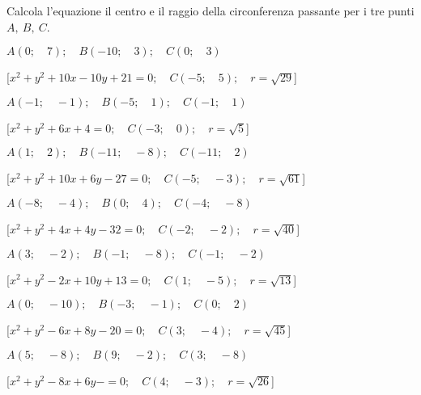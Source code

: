 \begin{esercizio}\label{ese:}
 Calcola l'equazione il centro e il raggio della circonferenza passante per 
i tre punti \(A,~B,~C\).
 \begin{enumeratea}
  \item  \(A \left (0; \quad 7 \right ); \quad B \left (-10; \quad 3 \right ); 
\quad C \left (0; \quad 3 \right )\)

   \hfill [\(x^2 + y^2 +10x -10y +21 = 0; \quad C \left (-5; \quad 5 \right ); 
\quad r = \sqrt{29}\)]

  \item  \(A \left (-1; \quad -1 \right ); \quad B \left (-5; \quad 1 \right ); 
\quad C \left (-1; \quad 1 \right )\)

   \hfill [\(x^2 + y^2 +6x +4 = 0; \quad C \left (-3; \quad 0 \right ); \quad r 
= \sqrt{5}\)]

  \item  \(A \left (1; \quad 2 \right ); \quad B \left (-11; \quad -8 \right ); 
\quad C \left (-11; \quad 2 \right )\)

   \hfill [\(x^2 + y^2 +10x +6y -27 = 0; \quad C \left (-5; \quad -3 \right ); 
\quad r = \sqrt{61}\)]

  \item  \(A \left (-8; \quad -4 \right ); \quad B \left (0; \quad 4 \right ); 
\quad C \left (-4; \quad -8 \right )\)

   \hfill [\(x^2 + y^2 +4x +4y -32 = 0; \quad C \left (-2; \quad -2 \right ); 
\quad r = \sqrt{40}\)]

  \item  \(A \left (3; \quad -2 \right ); \quad B \left (-1; \quad -8 \right ); 
\quad C \left (-1; \quad -2 \right )\)

   \hfill [\(x^2 + y^2 -2x +10y +13 = 0; \quad C \left (1; \quad -5 \right ); 
\quad r = \sqrt{13}\)]

  \item  \(A \left (0; \quad -10 \right ); \quad B \left (-3; \quad -1 \right ); 
\quad C \left (0; \quad 2 \right )\)

   \hfill [\(x^2 + y^2 -6x +8y -20 = 0; \quad C \left (3; \quad -4 \right ); 
\quad r = \sqrt{45}\)]

  \item  \(A \left (5; \quad -8 \right ); \quad B \left (9; \quad -2 \right ); 
\quad C \left (3; \quad -8 \right )\)

   \hfill [\(x^2 + y^2 -8x +6y - = 0; \quad C \left (4; \quad -3 \right ); \quad 
r = \sqrt{26}\)]


\end{enumeratea}
\end{esercizio}
